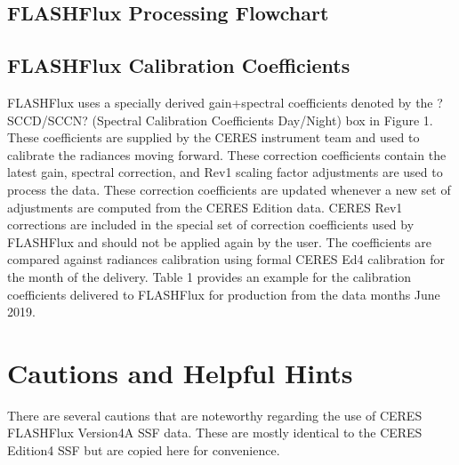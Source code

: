 \documentclass[12pt]{article}
\begin{document}
\subsection{FLASHFlux Processing Flowchart}
\subsection{FLASHFlux Calibration Coefficients}
FLASHFlux uses a specially derived gain+spectral coefficients denoted by the ?SCCD/SCCN? (Spectral Calibration Coefficients Day/Night) box in Figure 1.  These coefficients are supplied by the CERES instrument team and used to calibrate the radiances moving forward.  These correction coefficients contain the latest gain, spectral correction, and Rev1 scaling factor adjustments are used to process the data. These correction coefficients are updated whenever a new set of adjustments are computed from the CERES Edition data. CERES Rev1 corrections are included in the special set of correction coefficients used by FLASHFlux and should not be applied again by the user.  The coefficients are compared against radiances calibration using formal CERES Ed4 calibration for the month of the delivery.  Table 1 provides an example for the calibration coefficients delivered to FLASHFlux for production from the data months June 2019.
\section{Cautions and Helpful Hints}\label{cautions}
There are several cautions that are noteworthy regarding the use of CERES FLASHFlux Version4A SSF data.  These are mostly identical to the CERES Edition4 SSF but are copied here for convenience.
\end{document}
